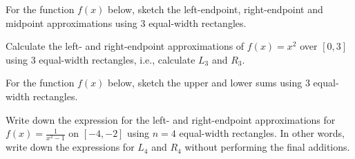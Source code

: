 \documentclass[../main.tex]{subfiles}
\begin{document}
\begin{example}
  For the function \(f(x)\) below, sketch the left-endpoint, right-endpoint and midpoint approximations using \(3\) equal-width rectangles.

  \hfill{}
  
  \hfill{}
  
  \hfill{}
  
  \hfill{}

\end{example}

\begin{example}
  Calculate the left- and right-endpoint approximations of \(f(x) = x^{2}\) over \([0, 3]\) using \(3\) equal-width rectangles, i.e., calculate \(L_{3}\) and \(R_{3}\).

\end{example}
\clearpage

\begin{exercise}
  For the function \(f(x)\) below, sketch the upper and lower sums using \(3\) equal-width rectangles.

  \hfill{}
  
  \hfill{}
  
  \hfill{}

\end{exercise}

\begin{exercise}
  Write down the expression for the left- and right-endpoint approximations for \(f(x) = \frac{1}{x^{2} - 1}\) on \([-4, -2]\) using \(n = 4\) equal-width rectangles. In other words, write down the expressions for \(L_{4}\) and \(R_{4}\) without performing the final additions.

\end{exercise}
\clearpage


%
%
%
\end{document}
